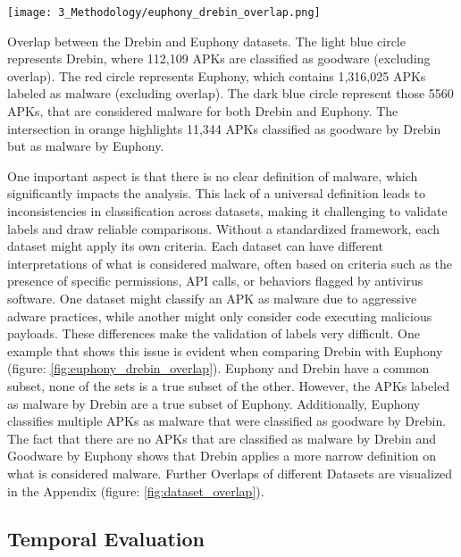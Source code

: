 \begin{marginfigure}[-50pt] %
    \texttt{[image: 3\_Methodology/euphony\_drebin\_overlap.png]}
    \caption{\label{fig:euphony_drebin_overlap}
    Overlap between the Drebin and Euphony datasets. 
    The light blue circle represents Drebin, where 112,109 APKs are classified as goodware (excluding overlap).
    The red circle represents Euphony, which contains 1,316,025 APKs labeled as malware (excluding overlap). 
    The dark blue circle represent those 5560 APKs, that are considered malware for both Drebin and Euphony.
    The intersection in orange highlights 11,344 APKs classified as goodware by Drebin but as malware by Euphony.}
\end{marginfigure}

One important aspect is that there is no clear definition of malware, 
which significantly impacts the analysis. 
This lack of a universal definition leads to inconsistencies in classification across datasets, 
making it challenging to validate labels and draw reliable comparisons. 
Without a standardized framework, each dataset might apply its own criteria.
Each dataset can have different interpretations of what is considered malware, 
often based on criteria such as the presence of specific permissions, 
API calls, or behaviors flagged by antivirus software. 
One dataset might classify an APK as malware due to aggressive adware practices, 
while another might only consider code executing malicious payloads. 
These differences make the validation of labels very difficult.
One example that shows this issue is evident when comparing Drebin with Euphony 
(figure: \ref{fig:euphony_drebin_overlap}).
Euphony and Drebin have a common subset, none of the sets is a true subset of the other.
However, the APKs labeled as malware by Drebin are a true subset of Euphony.
Additionally, Euphony classifies multiple APKs as malware that were classified as goodware by Drebin.
The fact that there are no APKs that are classified as malware by Drebin and Goodware 
by Euphony shows that Drebin applies a more narrow definition on what is considered malware.
Further Overlaps of different Datasets are visualized in the Appendix 
(figure: \ref{fig:dataset_overlap}).

\subsection{Temporal Evaluation}

